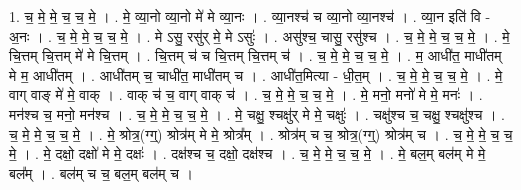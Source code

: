 \documentclass[17pt]{extarticle}
\begin{document}
1. च॒ मे॒ मे॒ च॒ च॒ मे॒ । . मे॒ व्या॒नो व्या॒नो मे॑ मे व्या॒नः । . व्या॒नश्च॑ च व्या॒नो व्या॒नश्च॑ । . व्या॒न इति॑ वि - अ॒नः । . च॒ मे॒ मे॒ च॒ च॒ मे॒ । . मे ऽसु॒ रसु॑र् मे॒ मे ऽसुः॑ । . असु॑श्च॒ चासु॒ रसु॑श्च । . च॒ मे॒ मे॒ च॒ च॒ मे॒ । . मे॒ चि॒त्तम् चि॒त्तम् मे॑ मे चि॒त्तम् । . चि॒त्तम् च॑ च चि॒त्तम् चि॒त्तम् च॑ । . च॒ मे॒ मे॒ च॒ च॒ मे॒ । . म॒ आधी॑त॒ माधी॑तम् मे म॒ आधी॑तम् । . आधी॑तम् च॒ चाधी॑त॒ माधी॑तम् च । . आधी॑त॒मित्या - धी॒त॒म् । . च॒ मे॒ मे॒ च॒ च॒ मे॒ । . मे॒ वाग् वाङ् मे॑ मे॒ वाक् । . वाक् च॑ च॒ वाग् वाक् च॑ । . च॒ मे॒ मे॒ च॒ च॒ मे॒ । . मे॒ मनो॒ मनो॑ मे मे॒ मनः॑ । . मन॑श्च च॒ मनो॒ मन॑श्च । . च॒ मे॒ मे॒ च॒ च॒ मे॒ । . मे॒ चक्षु॒ श्चक्षु॑र् मे मे॒ चक्षुः॑ । . चक्षु॑श्च च॒ चक्षु॒ श्चक्षु॑श्च । . च॒ मे॒ मे॒ च॒ च॒ मे॒ । . मे॒ श्रोत्र॒(ग्ग्॒) श्रोत्र॑म् मे मे॒ श्रोत्र᳚म् । . श्रोत्र॑म् च च॒ श्रोत्र॒(ग्ग्॒) श्रोत्र॑म् च । . च॒ मे॒ मे॒ च॒ च॒ मे॒ । . मे॒ दक्षो॒ दक्षो॑ मे मे॒ दक्षः॑ । . दक्ष॑श्च च॒ दक्षो॒ दक्ष॑श्च । . च॒ मे॒ मे॒ च॒ च॒ मे॒ । . मे॒ बल॒म् बल॑म् मे मे॒ बल᳚म् । . बल॑म् च च॒ बल॒म् बल॑म् च । \newline
\end{document}
